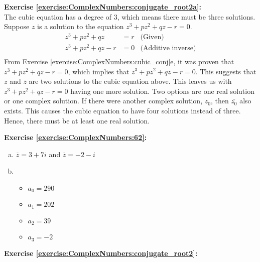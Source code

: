 \noindent\textbf{Exercise \ref{exercise:ComplexNumbers:conjugate_root2a}:}\\ %
The cubic equation has a degree of $3$, which means there must be three solutions. Suppose $z$ is a solution to the equation $z^{3} + pz^{2} + qz - r = 0$.  
\begin{align*}
z^{3} + pz^{2} + qz &= r &\text{(Given)}\\
z^{3} + pz^{2} + qz - r&= 0 &\text{(Additive inverse)}\\
\end{align*}
From Exercise \ref{exercise:ComplexNumbers:cubic_conj}e, it was proven that $z^3 + pz^2 + qz - r = 0$, which implies that $\overline{z}^{3}+ p\overline{z}^{2} + q\overline{z} - r = 0$. This suggests that $z$ and $\overline{z}$ are two solutions to the cubic equation above. This leaves us with $z^3 + pz^2 + qz - r = 0$ having one more solution. Two options are one real solution or one complex solution. If there were another complex solution, $z_{0}$, then $\overline{z_{0}}$ also exists. This causes the cubic equation to have four solutions instead of three. Hence, there must be at least one real solution.
  
\noindent\textbf{Exercise \ref{exercise:ComplexNumbers:62}:} %
\begin{enumerate}[(a)]
\item
$\overline{z} = 3 + 7i$ and $\overline{z} = -2 - i$

\item
	\begin{itemize}
	\item
	$a_{0} = 290$
	
	\item
	$a_{1} = 202$
	
	\item
	$a_{2} = 39$
	
	\item
	$a_{3} = -2$
	\end{itemize}
\end{enumerate}

\noindent\textbf{Exercise \ref{exercise:ComplexNumbers:conjugate_root2}:}

